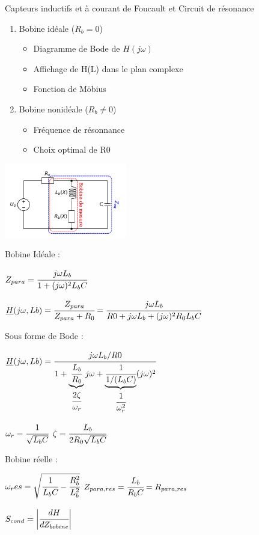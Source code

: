 \documentclass[	DIV=calc,%
							paper=a4,%
							fontsize=11pt,%
							twocolumn]{scrartcl} %
\begin{document}
Capteurs inductifs et à courant de Foucault et Circuit de résonance


\begin{enumerate}
    \item Bobine idéale ($R_b = 0$)
        \begin{itemize}
            \item Diagramme de Bode de $H(j\omega)$
            \item Affichage de H(L) dans le plan complexe
            \item Fonction de Möbius
        \end{itemize}
    \item Bobine nonidéale ($R_b \neq 0$)
        \begin{itemize}
            \item Fréquence de résonnance
            \item Choix optimal de R0
        \end{itemize}
\end{enumerate}

\includegraphics[width = 0.4\textwidth,center]{img/circuit_res.pdf}

Bobine Idéale :

$Z_{para} = \cfrac{j\omega L_b}{1+(j\omega)^2L_bC}$

$\underline{H}(j\omega,Lb) = \cfrac{Z_{para} }{Z_{para} + R_0} = \cfrac{j\omega L_b}{R0 + j\omega L_b+(j\omega)^2R_0L_bC}$

Sous forme de Bode : 


$\underline{H}(j\omega,Lb) = \cfrac{j\omega L_b/R0}{1+ \underbrace{\cfrac{L_b}{R_0}}_{\cfrac{2\zeta}{\omega_r}}j\omega + \underbrace{\cfrac{1}{1/(L_bC)}}_{\cfrac{1}{\omega_r^2}}(j\omega)^2}$

$\omega_r = \cfrac{1}{\sqrt{L_b C}}$ \quad $\zeta = \cfrac{L_b}{2R_0\sqrt{L_b C}}$


Bobine réelle :

$\omega_res = \sqrt{\cfrac{1}{L_b C} - \cfrac{R_b^2}{L_b^2}}$ \quad $Z_{para,res} = \cfrac{L_b}{R_b C} = R_{para,res}$

$S_{cond} = \biggl|\cfrac{dH}{dZ_{bobine}}\biggr|$
\end{document}
